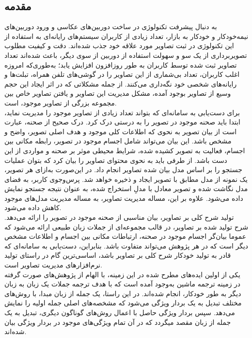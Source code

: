 \subsection{مقدمه}

به دنبال پیشرفت تکنولوژی در ساخت دوربین‌های عکاسی و ورود دوربین‌های نیمه‌خودکار و خودکار به بازار، تعداد زیادی از کاربران سیستم‌های رایانه‌ای به استفاده از این تکنولوژی در ثبت تصاویر مورد علاقه خود جذب شده‌اند. دقت و کیفیت مطلوب تصویربرداری از یک سو و سهولت استفاده از دوربین‌ از سوی دیگر، باعث شده‌اند تعداد تصاویر ثبت شده توسط کاربران به طور روزافزون افزایش یابد؛ به‌طوری‌که امروزه اغلب کاربران، تعداد بی‌شماری از این تصاویر را در گوشی‌های تلفن همراه، تبلت‌ها و رایانه‌های شخصی خود نگه‌داری می‌کنند.
از جمله مشکلاتی که در اثر ایجاد این حجم وسیع از تصاویر بوجود آمده، مشکل مدیریت این تصاویر و یافتن تصاویر خاص بین مجموعه بزرگی از تصاویر موجود، است.
\\
برای دست‌یابی به سامانه‌ای که بتواند تعداد زیادی از تصاویر موجود را مدیریت نماید، ابتدا باید صحنه موجود در تصویر را به درستی درک کرد. درک صحیح از صحنه، عبارت است از بیان تصویر به نحوی که اطلاعات کلی موجود و هدف اصلی تصویر، واضح و مشخص باشد. این بیان می‌تواند شامل اجسام موجود در تصویر، رابطه مکانی بین اجسام، فعالیت به تصویر کشیده شده، شرایط محیطی موثر بر صحنه و مواردی از این دست باشد. از طرفی باید به نحوی محتوای تصاویر را بیان کرد که بتوان عملیات جستجو را بر اساس مدل بیان شده تصاویر انجام داد. در این‌صورت به‌ازای هر تصویر، یک نمونه از مدل مطابق با تصویر ایجاد و ذخیره خواهد شد. پرس‌و‌جوی کاربر، به فضای مدل نگاشت شده و تصویر معادل با مدلِ استخراج شده، به عنوان نتیجه جستجو نمایش داده می‌شود. علاوه بر این، مساله مدیریت تصاویر، به مساله مدیریت مدل‌های موجود کاهش داده می‌شود.
\\
تولید شرح کلی بر تصاویر، بیان مناسبی از صحنه موجود در تصویر را ارائه می‌دهد. شرح تولید شده بر تصاویر، در قالب مجموعه‌ای از جملات زبان طبیعی ارائه‌ می‌شود که عموما بیان‌گر اجسام موجود در صحنه‌، ارتباطات مکانی بین اجسام و اطلاعات مشخص دیگر است که در هر پژوهش می‌تواند متفاوت باشد. بنابراین، دست‌یابی به سامانه‌ای که قادر به تولید خودکار شرح کلی بر تصاویر باشد، اساسی‌ترین گام در راستای تولید نرم‌افزارهای مدیریت تصاویر است.
\\
یکی از اولین ایده‌های مطرح شده در این زمینه، با الهام از پژوهش­‌های صورت گرفته در زمینه ترجمه ماشین
 به‌وجود آمده‌ است که با هدف ترجمه جملات یک زبان به زبان دیگر به طور خودکار، انجام شده‌اند. در این راستا، یک جمله از زبان مبدا، با روش‌های مختلف تبدیل به یک بردار ویژگی می‌شود که مشخصه‌های اصلی جمله اولیه را نمایش می‌دهد. سپس بردار ویژگی حاصل با اعمال روش­‌های گوناگون دیگری، تبدیل به یک جمله از زبان مقصد می­گردد که در آن تمام ویژگی‌های موجود در بردار ویژگی بیان شده‌‌اند.
